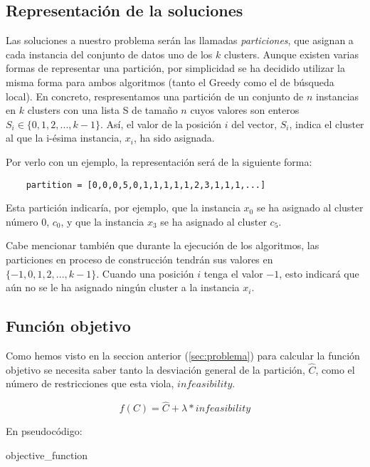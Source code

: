 \documentclass[11pt,a4paper]{article}
\begin{document}
	\subsection{Representación de la soluciones}
	Las soluciones a nuestro problema serán las llamadas \textit{particiones}, que asignan a cada instancia del conjunto de datos uno de los $k$ clusters. Aunque existen varias formas de representar una partición, por simplicidad se ha decidido utilizar la misma forma para ambos algoritmos (tanto el Greedy como el de búsqueda local). En concreto, respresentamos una partición de un conjunto de $n$ instancias en $k$ clusters con una lista S de tamaño $n$ cuyos valores son enteros $S_i \in \{0,1,2,...,k-1\}$. Así, el valor de la posición $i$ del vector, $S_i$, indica el cluster al que la i-ésima instancia, $x_i$, ha sido asignada. 
	
	Por verlo con un ejemplo, la representación será de la siguiente forma:

	\begin{lstlisting}
	partition = [0,0,0,5,0,1,1,1,1,1,2,3,1,1,1,...]
	\end{lstlisting}
	Esta partición indicaría, por ejemplo, que la instancia $x_0$ se ha asignado al cluster número 0, $c_0$, y que la instancia $x_3$ se ha asignado al cluster $c_5$. 
	
	Cabe mencionar también que durante la ejecución de los algoritmos, las particiones en proceso de construcción tendrán sus valores en $\{-1,0,1,2,...,k-1\}$. Cuando una posición $i$ tenga el valor $-1$, esto indicará que aún no se le ha asignado ningún cluster a la instancia $x_i$.
	
	\subsection{Función objetivo}
	Como hemos visto en la seccion anterior (\ref{sec:problema}) para calcular la función objetivo se necesita saber tanto la desviación general de la partición, $\hat{C}$, como el número de restricciones que esta viola, $infeasibility$. 
	
	$$f(C) = \hat{C} + \lambda * infeasibility$$
	
	En pseudocódigo:
	\begin{algorithm}
	 	\caption{objective\_function}
	\end{algorithm}
	
\end{document}
